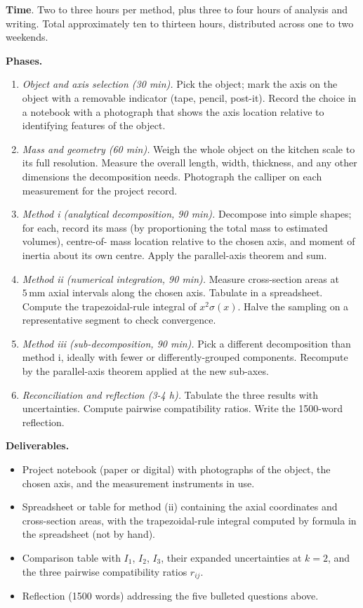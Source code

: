 \begin{project}
\textbf{Time}. Two to three hours per method, plus three to four
hours of analysis and writing. Total approximately ten to thirteen
hours, distributed across one to two weekends.

\medskip
\textbf{Phases.}
\begin{enumerate}[leftmargin=*]
  \item \textit{Object and axis selection (30 min).} Pick the
    object; mark the axis on the object with a removable indicator
    (tape, pencil, post-it). Record the choice in a notebook with
    a photograph that shows the axis location relative to identifying
    features of the object.
  \item \textit{Mass and geometry (60 min).} Weigh the whole
    object on the kitchen scale to its full resolution. Measure the
    overall length, width, thickness, and any other dimensions the
    decomposition needs. Photograph the calliper on each
    measurement for the project record.
  \item \textit{Method i (analytical decomposition, 90 min).}
    Decompose into simple shapes; for each, record its mass (by
    proportioning the total mass to estimated volumes), centre-of-
    mass location relative to the chosen axis, and moment of
    inertia about its own centre. Apply the parallel-axis theorem
    and sum.
  \item \textit{Method ii (numerical integration, 90 min).}
    Measure cross-section areas at $5\,\text{mm}$ axial intervals
    along the chosen axis. Tabulate in a spreadsheet. Compute the
    trapezoidal-rule integral of $x^{2} \sigma(x)$. Halve the
    sampling on a representative segment to check convergence.
  \item \textit{Method iii (sub-decomposition, 90 min).} Pick a
    different decomposition than method i, ideally with fewer or
    differently-grouped components. Recompute by the parallel-axis
    theorem applied at the new sub-axes.
  \item \textit{Reconciliation and reflection (3-4 h).} Tabulate
    the three results with uncertainties. Compute pairwise
    compatibility ratios. Write the 1500-word reflection.
\end{enumerate}

\textbf{Deliverables.}
\begin{itemize}[leftmargin=*]
  \item Project notebook (paper or digital) with photographs of
    the object, the chosen axis, and the measurement instruments
    in use.
  \item Spreadsheet or table for method (ii) containing the axial
    coordinates and cross-section areas, with the trapezoidal-rule
    integral computed by formula in the spreadsheet (not by hand).
  \item Comparison table with $I_{1}$, $I_{2}$, $I_{3}$, their
    expanded uncertainties at $k = 2$, and the three pairwise
    compatibility ratios $r_{ij}$.
  \item Reflection (1500 words) addressing the five bulleted
    questions above.
\end{itemize}


\end{project}
